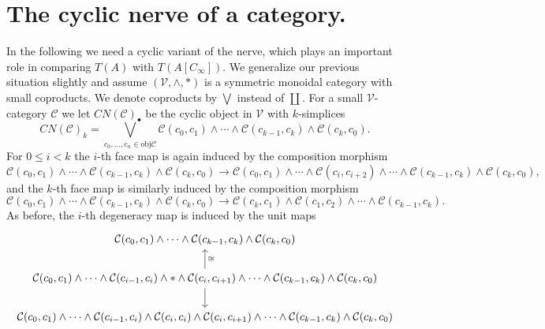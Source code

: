 \section{The cyclic nerve of a category.}
In the following we  need
a cyclic variant of the nerve, which plays an important role in
comparing $T(A)$ with $T(A[C_\infty])$. We generalize our
previous situation slightly and assume
$(\mathcal{V},\wedge,\ast)$ is a symmetric monoidal category
with small coproducts. We denote coproducts by $\bigvee$
instead of $\coprod$. For a small $\mathcal{V}$-category $\mathcal{C}$
we let $CN(\mathcal{C})_\bullet$ be the cyclic object in $\mathcal{V}$ with
$k$-simplices 
\begin{equation}\label{eq:cyclicnervesimplices}
CN(\mathcal{C})_k = \bigvee_{c_0,\ldots, c_n\in \mathrm{ obj } \mathcal{C}}
\mathcal{C}(c_0,c_1)\wedge \cdots \wedge \mathcal{C}(c_{k-1}, c_k)\wedge
\mathcal{C}(c_k, c_0).
\end{equation}
For $0\le i<k$ the $i$-th face map is again induced by the composition morphism
\begin{equation*}
\mathcal{C}(c_0,c_1)\wedge \cdots \wedge \mathcal{C}(c_{k-1}, c_k)\wedge \mathcal{C}(c_k, c_0) \to 
\mathcal{C}(c_0,c_1)\wedge \cdots\wedge
\mathcal{C}(c_{i}, c_{i+2})\wedge 
 \cdots \wedge \mathcal{C}(c_{k-1}, c_k)\wedge \mathcal{C}(c_k, c_0),
\end{equation*}
and the $k$-th face map is similarly induced by the composition morphism
\begin{equation*}
\mathcal{C}(c_0,c_1)\wedge \cdots \wedge \mathcal{C}(c_{k-1}, c_k)\wedge \mathcal{C}(c_k, c_0) \to 
\mathcal{C}(c_k,c_1)\wedge \mathcal{C}(c_1,c_2)\wedge\cdots
\wedge \mathcal{C}(c_{k-1}, c_k).
\end{equation*}
As before, the $i$-th degeneracy map is induced by the unit maps
\begin{equation*}\begin{tikzcd}
\mathcal{C}(c_0,c_1)\wedge \cdots \wedge \mathcal{C}(c_{k-1}, c_k)\wedge \mathcal{C}(c_k, c_0)\\
 \mathcal{C}(c_0,c_1)\wedge \cdots \wedge \mathcal{C}(c_{i-1}, c_i) \wedge \ast
\wedge \mathcal{C}(c_{i}, c_{i+1})\wedge
\cdots \wedge \mathcal{C}(c_{k-1}, c_k)\wedge \mathcal{C}(c_k, c_0)
\arrow[swap]{u}{\cong}\arrow{d}\\
\mathcal{C}(c_0,c_1)\wedge \cdots \wedge \mathcal{C}(c_{i-1}, c_i) \wedge \mathcal{C}(c_{i}, c_i)
\wedge \mathcal{C}(c_{i}, c_{i+1})\wedge
\cdots \wedge \mathcal{C}(c_{k-1}, c_k) \wedge \mathcal{C}(c_k, c_0)
\end{tikzcd}
\end{equation*}
